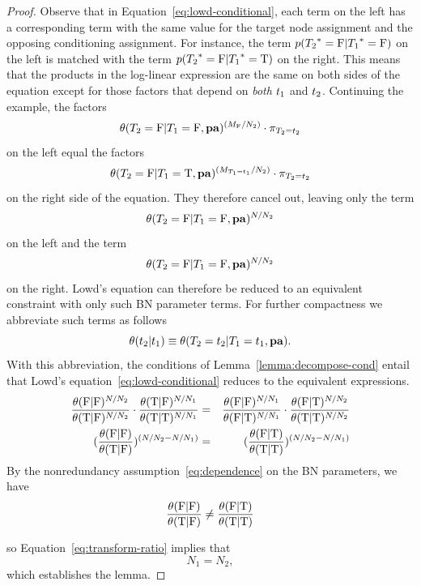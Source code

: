 \documentclass[runningheads,a4paper]{llncs}
\begin{document}
\begin{proof}
Observe that in Equation~\eqref{eq:lowd-conditional}, each term on the left has a corresponding term with the same value for the target node assignment and the opposing conditioning assignment. For instance, the term $p({T_{2}}^{*}\hspace{0.0ex}=\mathrm{F}|{T_{1}}^{*}\hspace{0.0ex}=\mathrm{F})$ on the left is matched with the term $p({T_{2}}^{*}\hspace{0.0ex}=\mathrm{F}|{T_{1}}^{*}\hspace{0.0ex}=\mathrm{T})$ on the right. This means that the products in the log-linear expression are the same on both sides of the equation except for those factors that depend on {\em both} $t_{1}$ and $t_{2}$. Continuing the example, the factors $$\theta(T_{2} = \mathrm{F}|T_{1} = \mathrm{F},\mathbf{pa})^{(M_{\mathrm{F}}/N_{2})} \cdot \pi_{T_2=t_{2}}$$ on the left equal the factors $$\theta(T_{2} = \mathrm{F}|T_{1} = \mathrm{T},\mathbf{pa})^{(M_{T_1=t_{1}}/N_{2})}\cdot \pi_{T_2=t_{2}}$$ on the right side of the equation. They therefore cancel out, leaving only the term $$\theta(T_{2} = \mathrm{F}|T_{1} = \mathrm{F},\mathbf{pa})^{N/N_{2}}$$ on the left and the term $$\theta(T_{2} = \mathrm{F}|T_{1} = \mathrm{F},\mathbf{pa})^{N/N_{2}}$$ on the right. Lowd's equation can therefore be reduced to an equivalent constraint with only such BN parameter terms. For further compactness we abbreviate such terms as follows
%
$$\theta(t_{2}|t_{1}) \equiv \theta(T_{2} = t_{2}|T_{1} = t_{1},\mathbf{pa}).$$ With this abbreviation, the conditions of Lemma~\ref{lemma:decompose-cond} entail that Lowd's equation~\ref{eq:lowd-conditional} reduces to the equivalent expressions.
%
\begin{eqnarray}
\frac{\theta(\mathrm{F}|\mathrm{F})^{N/N_{2}}}{\theta(\mathrm{T}|\mathrm{F})^{N/N_{2}} }  \cdot \frac{\theta(\mathrm{T}|\mathrm{F})^{N/N_{1}} }{\theta(\mathrm{T}|\mathrm{T})^{N/N_{1}} }  & = & \frac{\theta(\mathrm{F}|\mathrm{F})^{N/N_{1}} }{\theta(\mathrm{F}|\mathrm{T})^{N/N_{1}} }  \cdot \frac{\theta(\mathrm{F}|\mathrm{T})^{N/N_{2}} }{\theta(\mathrm{T}|\mathrm{T})^{N/N_{2}} } \\
(\frac{\theta(\mathrm{F}|\mathrm{F})}{\theta(\mathrm{T}|\mathrm{F}) })^{\left(N/N_{2}-N/N_{1}\right)}   & = &  (\frac{\theta(\mathrm{F}|\mathrm{T}) }{\theta(\mathrm{T}|\mathrm{T})})^{\left(N/N_{2}-N/N_{1}\right)} \label{eq:transform-ratio}
\end{eqnarray}
By the nonredundancy  assumption~\eqref{eq:dependence} on the BN parameters, we have
%
$$\frac{\theta(\mathrm{F}|\mathrm{F})}{\theta(\mathrm{T}|\mathrm{F}) }   \neq  \frac{\theta(\mathrm{F}|\mathrm{T}) }{\theta(\mathrm{T}|\mathrm{T})}$$

so Equation~\ref{eq:transform-ratio} implies that 
%
$$N_{1} = N_{2}, $$ which establishes the lemma. 
\end{proof}
\end{document}

